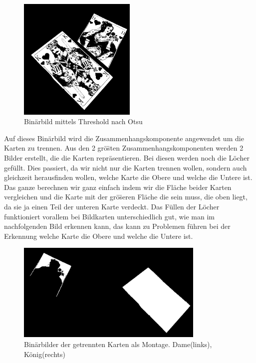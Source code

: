 \documentclass[paper=A4, deutsch]{scrartcl}
\begin{document}
\begin{figure}[h!]
 \centering
 \includegraphics[width=0.5\textwidth]{otsu_example.PNG}
 \caption{Bin\"arbild mittels Threshold nach Otsu}
 \label{fig:img}
\end{figure}

Auf dieses Bin\"arbild wird die Zusammenhangskomponente angewendet um die Karten zu trennen. Aus den 2 gr\"o\"sten Zusammenhangskomponenten 
werden 2 Bilder erstellt, die die Karten repr\"asentieren. Bei diesen werden noch die L\"ocher gef\"ullt. Dies passiert,
da wir nicht nur die Karten trennen wollen, sondern auch gleichzeit herausfinden wollen, welche Karte die Obere und welche die Untere ist.
Das ganze berechnen wir ganz einfach indem wir die Fl\"ache beider Karten vergleichen und die Karte mit der gr\"o\"seren Fl\"ache die sein muss,
die oben liegt, da sie ja einen Teil der unteren Karte verdeckt. Das F\"ullen der L\"ocher funktioniert vorallem bei Bildkarten unterschiedlich gut,
wie man im nachfolgenden Bild erkennen kann, das kann zu Problemen f\"uhren bei der Erkennung welche Karte die Obere und welche die Untere ist.

\begin{figure}[h!]
 \centering
 \includegraphics[width=0.8\textwidth]{splitCards_example.PNG}
 \caption{Bin\"arbilder der getrennten Karten als Montage. Dame(links), K\"onig(rechts)}
 \label{fig:img}
\end{figure}
\end{document}
